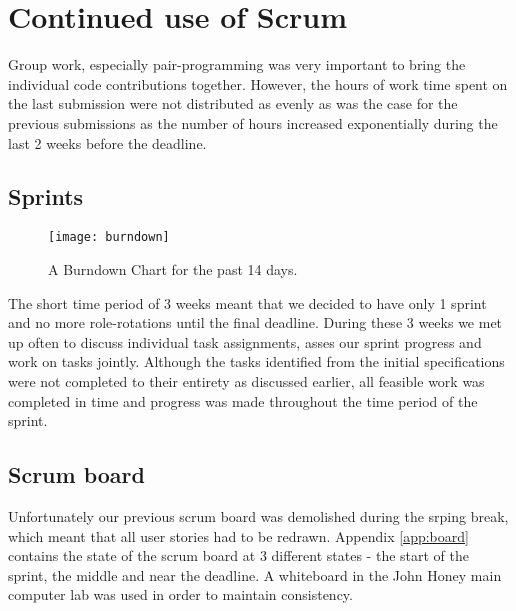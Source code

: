 \section{Continued use of Scrum}
Group work, especially pair-programming was very important to bring the individual code contributions together. However, the hours of work time spent on the last submission were not distributed as evenly as was the case for the previous submissions as the number of hours increased exponentially during the last 2 weeks before the deadline.
\subsection{Sprints}

\begin{figure}[h]
	\centering
	\texttt{[image: burndown]}
	\caption{A Burndown Chart for the past 14 days.}\label{fig:burn}
\end{figure}
The short time period of 3 weeks meant that we decided to have only 1 sprint and no more role-rotations until the final deadline. During these 3 weeks we met up often to discuss individual task assignments, asses our sprint progress and work on tasks jointly. Although the tasks identified from the initial specifications were not completed to their entirety as discussed earlier, all feasible work was completed in time and progress was made throughout the time period of the sprint.
\subsection{Scrum board}
Unfortunately our previous scrum board was demolished during the srping break, which meant that all user stories had to be redrawn. Appendix \ref{app:board} contains the state of the scrum board at 3 different states - the start of the sprint, the middle and near the deadline. A whiteboard in the John Honey main computer lab was used in order to maintain consistency. 